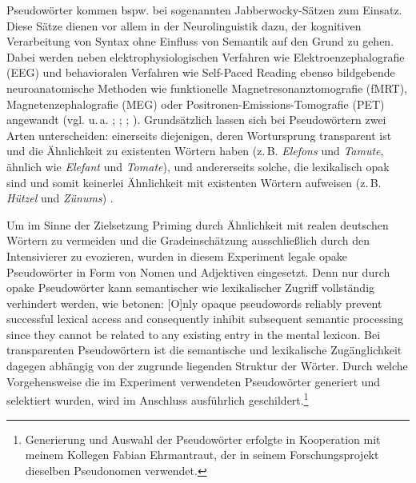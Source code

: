 Pseudowörter kommen bspw. bei sogenannten Jabberwocky-Sätzen zum Einsatz. Diese Sätze dienen vor allem in der Neurolinguistik dazu, der kognitiven Verarbeitung von Syntax ohne Einfluss von Semantik auf den Grund zu gehen. Dabei werden neben elektrophysiologischen Verfahren wie Elektroenzephalografie (EEG) und behavioralen Verfahren wie Self-Paced Reading ebenso bildgebende neuroanatomische Methoden wie funktionelle Magnetresonanztomografie (fMRT), Magnetenzephalografie (MEG) oder Positronen-Emissions-Tomografie (PET) angewandt (vgl. u.\,a. \citealt[]{Mazoyer.1993}; \citealt[]{Hahne.2001}; \citealt[]{Humphries.2006}; \citealt[]{Kharkwal.2014}). Grundsätzlich lassen sich bei Pseudowörtern zwei Arten unterscheiden: einerseits diejenigen, deren Wortursprung transparent ist und die Ähnlichkeit zu existenten Wörtern haben (z.\,B. \textit{Elefons} und \textit{Tamute}, ähnlich wie  \textit{Elefant} und \textit{Tomate}), und andererseits solche, die lexikalisch opak sind und somit keinerlei Ähnlichkeit mit existenten Wörtern aufweisen (z.\,B. \textit{Hützel} und \textit{Zünums}) {\citep[vgl.][1420]{Raettig.2008}}.


Um im Sinne der Zielsetzung Priming durch Ähnlichkeit mit realen deutschen Wörtern zu vermeiden und die Gradeinschätzung ausschließlich durch den Intensivierer zu evozieren, wurden in diesem Experiment legale opake Pseudowörter in Form von Nomen und Adjektiven eingesetzt. Denn nur durch opake Pseudowörter kann semantischer wie lexikalischer Zugriff vollständig verhindert werden, wie \citet[1426]{Raettig.2008} betonen: \glqq{}[O]nly opaque pseudowords reliably prevent successful lexical access and consequently inhibit subsequent semantic processing since they cannot be related to any existing entry in the mental lexicon.\grqq{} Bei transparenten Pseudowörtern ist die semantische und lexikalische Zugänglichkeit dagegen abhängig von der zugrunde liegenden Struktur der Wörter. Durch welche Vorgehensweise die im Experiment verwendeten Pseudowörter generiert und selektiert wurden, wird im Anschluss ausführlich geschildert.\footnote{Generierung und Auswahl der Pseudowörter erfolgte in Kooperation mit meinem Kollegen Fabian Ehrmantraut, der in seinem Forschungsprojekt dieselben {Pseudonomen verwendet}.}


